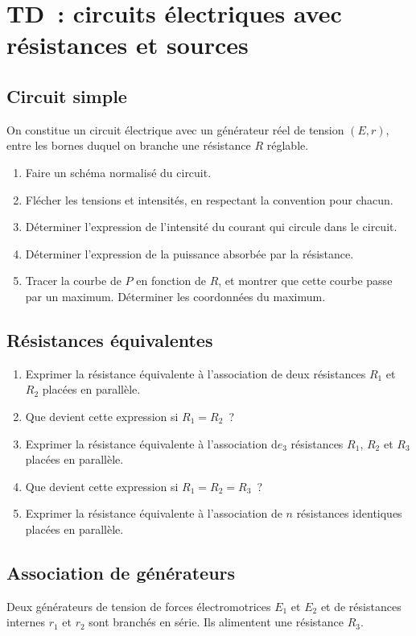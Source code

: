 \documentclass[a4paper, 12pt, final, garamond]{book}
\begin{document}
\setcounter{chapter}{1}

\chapter{TD~: circuits \'electriques avec r\'esistances et sources}

\section{Circuit simple}
On constitue un circuit électrique avec un générateur réel de tension $(E,r)$,
entre les bornes duquel on branche une résistance $R$ réglable.

\begin{enumerate}
    \item Faire un schéma normalisé du circuit.
    \item Flécher les tensions et intensités, en respectant la convention pour
        chacun.
    \item Déterminer l'expression de l'intensité du courant qui circule dans le
        circuit.
    \item Déterminer l'expression de la puissance absorbée par la résistance.
    \item Tracer la courbe de $P$ en fonction de $R$, et montrer que cette
        courbe passe par un maximum. Déterminer les coordonnées du maximum.
\end{enumerate}

\section{Résistances équivalentes}
\begin{enumerate}
    \item Exprimer la résistance équivalente à l'association de deux résistances
        $R_1$ et $R_2$ placées en parallèle.
    \item Que devient cette expression si $R_1 = R_2$~?
    \item Exprimer la résistance équivalente à l'association d$e_3$ résistances
        $R_1$, $R_2$ et $R_3$ placées en parallèle.
    \item Que devient cette expression si $R_1 = R_2 = R_3$~?
    \item Exprimer la résistance équivalente à l'association de $n$ résistances
        identiques placées en parallèle.
\end{enumerate}

\section{Association de générateurs}
Deux générateurs de tension de forces électromotrices $E_1$ et $E_2$ et de
résistances internes $r_1$ et $r_2$ sont branchés en série. Ils alimentent une
résistance $R_3$.
\end{document}
